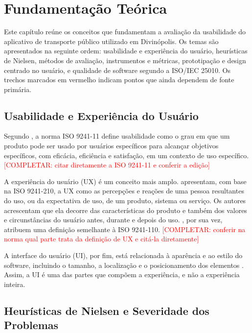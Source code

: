 \chapter[Fundamentação Teórica]{Fundamentação Teórica}\label{capitulo3}

\providecommand{\completar}[1]{\textcolor{red}{[COMPLETAR: #1]}}

Este capítulo reúne os conceitos que fundamentam a avaliação da usabilidade do aplicativo de transporte público utilizado em Divinópolis. Os temas são apresentados na seguinte ordem: usabilidade e experiência do usuário, heurísticas de Nielsen, métodos de avaliação, instrumentos e métricas, prototipação e design centrado no usuário, e qualidade de software segundo a ISO/IEC 25010. Os trechos marcados em vermelho indicam pontos que ainda dependem de fonte primária.

\section{Usabilidade e Experiência do Usuário}

Segundo , a norma ISO 9241-11 define usabilidade como o grau em que um produto pode ser usado por usuários específicos para alcançar objetivos específicos, com eficácia, eficiência e satisfação, em um contexto de uso específico. \completar{citar diretamente a ISO 9241-11 e conferir a edição}

A experiência do usuário (UX) é um conceito mais amplo.  apresentam, com base na ISO 9241-210, a UX como as percepções e reações de uma pessoa resultantes do uso, ou da expectativa de uso, de um produto, sistema ou serviço. Os autores acrescentam que ela decorre das características do produto e também dos valores e circunstâncias do usuário antes, durante e depois do uso. , por sua vez, atribuem uma definição semelhante à ISO 9241-110. \completar{conferir na norma qual parte trata da definição de UX e citá-la diretamente}

A interface do usuário (UI), por fim, está relacionada à aparência e ao estilo do software, incluindo o tamanho, a localização e o posicionamento dos elementos \cite{suzianti2020}. Assim, a UI é uma das partes que compõem a experiência, e não a experiência inteira.

\section{Heurísticas de Nielsen e Severidade dos Problemas}

